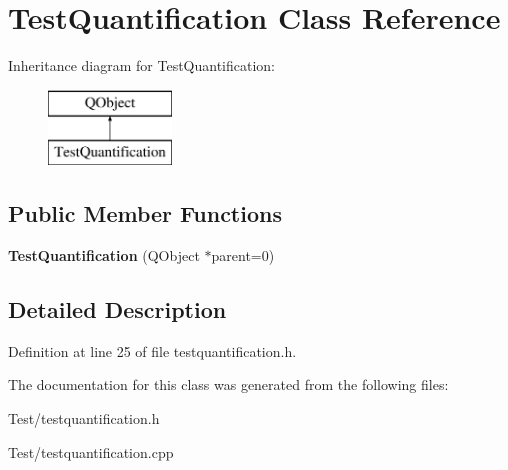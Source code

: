 \hypertarget{class_test_quantification}{}\section{Test\+Quantification Class Reference}
\label{class_test_quantification}
Inheritance diagram for Test\+Quantification\+:\begin{figure}[H]
\begin{center}
\leavevmode
\includegraphics[height=2.000000cm]{class_test_quantification}
\end{center}
\end{figure}
\subsection*{Public Member Functions}
\begin{DoxyCompactItemize}
\item 
{\bfseries Test\+Quantification} (Q\+Object $\ast$parent=0)\hypertarget{class_test_quantification_a5e4f7b4d4858cf545339db729f4b70d0}{}\label{class_test_quantification_a5e4f7b4d4858cf545339db729f4b70d0}

\end{DoxyCompactItemize}


\subsection{Detailed Description}


Definition at line 25 of file testquantification.\+h.



The documentation for this class was generated from the following files\+:\begin{DoxyCompactItemize}
\item 
Test/testquantification.\+h\item 
Test/testquantification.\+cpp\end{DoxyCompactItemize}
